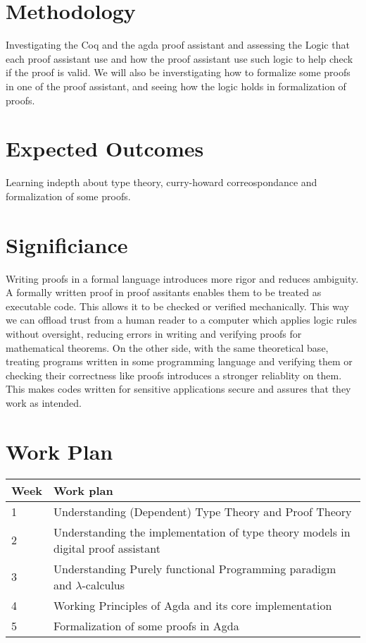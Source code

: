 \documentclass{article}
\begin{document}
\section{Methodology}
Investigating the  Coq and the agda proof assistant and assessing the Logic that each proof assistant use and how the proof assistant use such logic to help check if the proof is valid.
We will also be inverstigating how to formalize some proofs in one of the proof assistant, and seeing how the logic holds in formalization of proofs. 

\section{Expected Outcomes}
Learning indepth about type theory, curry-howard correospondance and formalization of some proofs.  
\section{Significiance}
Writing proofs in a formal language introduces more rigor and reduces ambiguity. A formally written proof in proof assitants enables them to be treated as executable code. This allows it to be checked or verified mechanically. This way we can offload trust from a human reader to a computer which applies logic rules without oversight, reducing errors in writing and verifying proofs for mathematical theorems.
On the other side, with the same theoretical base, treating programs written in some programming language and verifying them or checking their correctness like proofs introduces a stronger reliablity on them. This makes codes written for sensitive applications secure and assures that they work as intended.

\section{Work Plan}
\begin{center}
    \begin{tabular}{p{1cm} p{10cm} }
        \toprule
        Week & Work plan \\
        \toprule
         1 & Understanding (Dependent) Type Theory and Proof Theory\\
        \midrule
         2 & Understanding the implementation of type theory models in digital proof assistant \\
        \midrule
         3 & Understanding Purely functional Programming paradigm and $ \lambda $-calculus\\
        \midrule
         4 & Working Principles of Agda and its core implementation \\
        \midrule 
         5 & Formalization of some proofs in Agda \\
        \bottomrule


    \end{tabular}
\end{center}
\pagebreak
\end{document}
